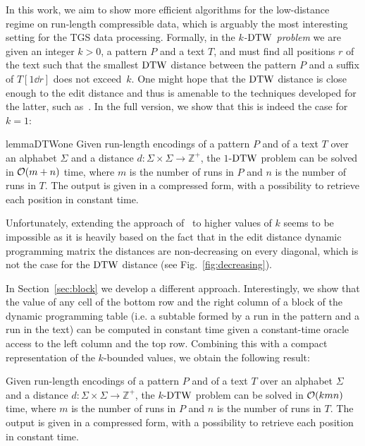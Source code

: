 In this work, we aim to show more efficient algorithms for the low-distance regime on run-length compressible data, which is arguably the most interesting setting for the TGS data processing. Formally, in the \emph{$k$-$\mathrm{DTW}$ problem} we are given an integer $k > 0$, a pattern $P$ and a text $T$, and must find all positions $r$ of the text such that the smallest $\mathrm{DTW}$ distance between the pattern $P$ and a suffix of $T[1 \dd r]$ does not exceed~$k$. One might hope that the $\mathrm{DTW}$ distance is close enough to the edit distance and thus is amenable to the techniques developed for the latter, such as~\cite{LMS98,LV97}. In the full version, we show that this is indeed the case for $k = 1$:

\begin{restatable}{lemma}{DTWone}
\label{lm:1-DTW}
Given run-length encodings of a pattern $P$ and of a text $T$ over an alphabet $\Sigma$ and a distance $d: \Sigma \times \Sigma \rightarrow \mathbb{Z}^+$, the $1$-$\mathrm{DTW}$ problem can be solved in $\mathcal{O}(m+n)$ time, where $m$ is the number of runs in $P$ and $n$ is the number of runs in $T$. The output is given in a compressed form, with a possibility to retrieve each position in constant time.
\end{restatable}

Unfortunately, extending the approach of~\cite{LMS98,LV97} to higher values of $k$ seems to be impossible as it is heavily based on the fact that in the edit distance dynamic programming matrix the distances are non-decreasing on every diagonal, which is not the case for the $\mathrm{DTW}$ distance (see Fig.~\ref{fig:decreasing}). 

In Section~\ref{sec:block} we develop a different approach. Interestingly, we show that the value of any cell of the bottom row and the right column of a block of the dynamic programming table (i.e. a subtable formed by a run in the pattern and a run in the text) can be computed in constant time given a constant-time oracle access to the left column and the top row. Combining this with a compact representation of the $k$-bounded values, we obtain the following result:

\begin{theorem}\label{th:block}
Given run-length encodings of a pattern $P$ and of a text $T$ over an alphabet $\Sigma$ and a distance $d: \Sigma \times \Sigma \rightarrow \mathbb{Z}^+$, the $k$-$\mathrm{DTW}$ problem can be solved in $\mathcal{O}(k mn)$ time, where $m$ is the number of runs in $P$ and $n$ is the number of runs in $T$. The output is given in a compressed form, with a possibility to retrieve each position in constant time.
\end{theorem}

